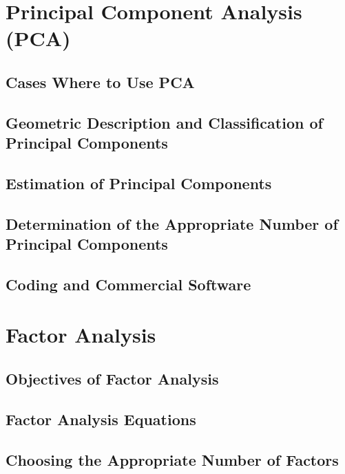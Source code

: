 \documentclass[12pt]{book}
\theoremstyle{definition}
\theoremstyle{remark}
\begin{document}
\chapter{Principal Component Analysis (PCA)}

\section{Cases Where to Use PCA}

\section{Geometric Description and Classification of Principal Components}

\section{Estimation of Principal Components}

\section{Determination of the Appropriate Number of Principal Components}

\section{Coding and Commercial Software}

\chapter{Factor Analysis}

\section{Objectives of Factor Analysis}

\section{Factor Analysis Equations}

\section{Choosing the Appropriate Number of Factors}
\end{document}
